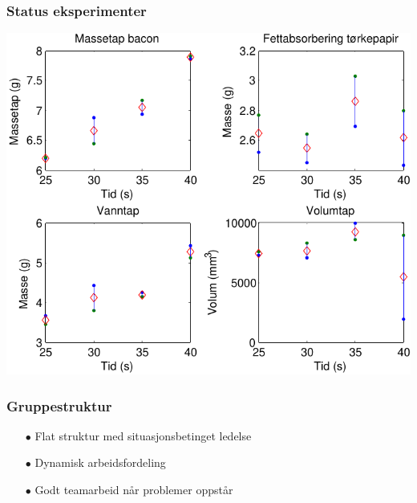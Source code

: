 \documentclass[screen]{beamer}
\begin{document}
\begin{frame}
  \frametitle{Status eksperimenter}
    \begin{center}
      \includegraphics[width=0.7\linewidth]{eksperiment.pdf}
    \end{center}
\end{frame}

\begin{frame}
  \frametitle{Gruppestruktur}
  \begin{itemize}
    \item[$\bullet$] Flat struktur med situasjonsbetinget ledelse
    \item[$\bullet$] Dynamisk arbeidsfordeling 
    \item[$\bullet$] Godt teamarbeid når problemer oppstår
  \end{itemize}
\end{frame}
\end{document}
